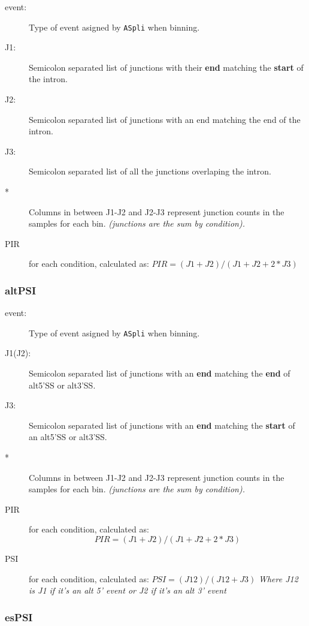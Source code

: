 \documentclass{article}
\begin{document}
\begin{description}
\item [event:] Type of event asigned by \texttt{ASpli} when binning. 
\item [J1:] Semicolon separated list of junctions with their \textbf{end} matching the \textbf{start} of the intron. 
\item [J2:] Semicolon separated list of junctions with an end matching the end of the intron. 
\item [J3:] Semicolon separated list of all the junctions overlaping the intron.
\item [*] Columns in between J1-J2 and J2-J3 represent junction counts in the samples for each bin. \textit{(junctions are the sum by condition).}
\item [PIR]   for each condition, calculated as: $ PIR = (J1 + J2)/(J1 + J2 + 2*J3) $
\end{description}

\subsubsection*{altPSI}
\begin{description}
\item [event:] Type of event asigned by \texttt{ASpli} when binning. 
\item [J1(J2):] Semicolon separated list of junctions with an \textbf{end} matching the \textbf{end} of alt5'SS or alt3'SS. 
\item [J3:] Semicolon separated list of junctions with an \textbf{end} matching the \textbf{start} of an alt5'SS or alt3'SS. 

\item [*] Columns in between J1-J2 and J2-J3 represent junction counts in the samples for each bin. \textit{(junctions are the sum by condition).}
\item [PIR] for each condition, calculated as: $$ PIR = (J1 + J2)/(J1 + J2 + 2*J3) $$
\item [PSI] for each condition, calculated as: $ PSI = (J12)/(J12 + J3)$
\textit{Where J12 is J1 if it's an alt 5' event or J2 if it's an alt 3' event}
\end{description}

\subsubsection*{esPSI}
\end{document}
